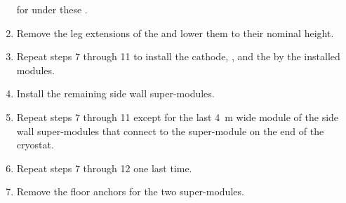 \begin{enumerate}
    for under these . %
    \item Remove the leg extensions of the  and lower them %
    to their nominal height. %
    \item Repeat steps \num{7} through \num{11}  %
    to install the cathode, , and the  by the installed  modules. %
    \item Install the remaining %
    side wall super-modules. %
    \item Repeat steps \num{7} through \num{11}  %
    except for the last \SI{4}{\m} wide module of the side wall super-modules that connect to the \endwall super-module on the  end of the cryostat.
    \item Repeat steps \num{7} through \num{12} %
    one last time.
    \item Remove the floor anchors for the two \endwall super-modules. %
\end{enumerate}




